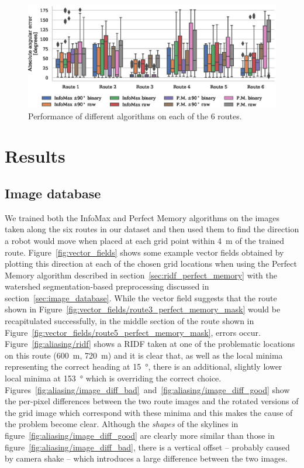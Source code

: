 \documentclass[letterpaper]{article}
\begin{document}
\begin{figure}[t]
    \centering
    \includegraphics{figures/route_benchmark.eps}
    \caption{Performance of different algorithms on each of the 6 routes.}
    \label{fig:route_benchmark}
\end{figure}

\section{Results}
\subsection{Image database}
We trained both the InfoMax and Perfect Memory algorithms on the images taken along the six routes in our dataset and then used them to find the direction a robot would move when placed at each grid point within \SI{4}{\metre} of the trained route. 
Figure~\ref{fig:vector_fields} shows some example vector fields obtained by plotting this direction at each of the chosen grid locations when using the Perfect Memory algorithm described in section~\ref{sec:ridf_perfect_memory} with the watershed segmentation-based preprocessing discussed in section~\ref{sec:image_database}. 
While the vector field suggests that the route shown in Figure~\ref{fig:vector_fields/route3_perfect_memory_mask} would be recapitulated successfully, in the middle section of the route shown in Figure~\ref{fig:vector_fields/route5_perfect_memory_mask}, errors occur.
Figure~\ref{fig:aliasing/ridf} shows a RIDF taken at one of the problematic locations on this route (\SI{600}{\metre}, \SI{720}{\metre}) and it is clear that, as well as the local minima representing the correct heading at \SI{15}{\degree}, there is an additional, slightly lower local minima at \SI{153}{\degree} which is overriding the correct choice.
Figures~\ref{fig:aliasing/image_diff_bad}~and~\ref{fig:aliasing/image_diff_good} show the per-pixel differences between the two route images and the rotated versions of the grid image which correspond with these minima and this makes the cause of the problem become clear.
Although the \emph{shapes} of the skylines in figure~\ref{fig:aliasing/image_diff_good} are clearly more similar than those in figure~\ref{fig:aliasing/image_diff_bad}, there is a vertical offset -- probably caused by camera shake -- which introduces a large difference between the two images.
\end{document}

